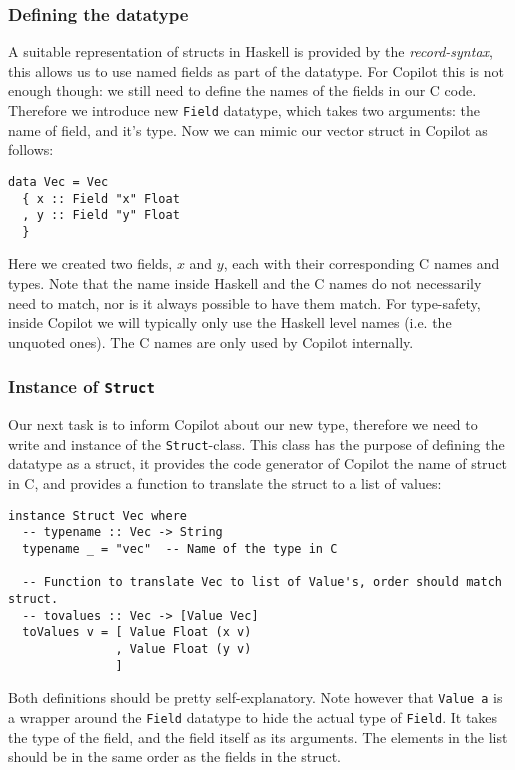 \subsubsection*{Defining the datatype}
A suitable representation of structs in Haskell is provided by the
\emph{record-syntax}, this allows us to use named fields as part of the
datatype. For Copilot this is not enough though: we still need to define the
names of the fields in our C code. Therefore we introduce new \texttt{Field}
datatype, which takes two arguments: the name of field, and it's type. Now we
can mimic our vector struct in Copilot as follows:
\begin{lstlisting}[language=Copilot]
data Vec = Vec
  { x :: Field "x" Float
  , y :: Field "y" Float
  }
\end{lstlisting}
Here we created two fields, $x$ and $y$, each with their corresponding C names
and types. Note that the name inside Haskell and the C names do not necessarily
need to match, nor is it always possible to have them match. For type-safety,
inside Copilot we will typically only use the Haskell level names (i.e. the
unquoted ones). The C names are only used by Copilot internally.


\subsubsection*{Instance of \texttt{Struct}}
Our next task is to inform Copilot about our new type, therefore we need to
write and instance of the \texttt{Struct}-class. This class has the purpose of
defining the datatype as a struct, it provides the code generator of Copilot the
name of struct in C, and provides a function to translate the struct to a list
of values:
\begin{lstlisting}[language=Copilot]
instance Struct Vec where
  -- typename :: Vec -> String
  typename _ = "vec"  -- Name of the type in C

  -- Function to translate Vec to list of Value's, order should match struct.
  -- tovalues :: Vec -> [Value Vec]
  toValues v = [ Value Float (x v)
               , Value Float (y v)
               ]
\end{lstlisting}
Both definitions should be pretty self-explanatory. Note however that
\texttt{Value a} is a wrapper around the \texttt{Field} datatype to hide the
actual type of \texttt{Field}. It takes the type of the field, and the field
itself as its arguments. The elements in the list should be in the same order
as the fields in the struct.

